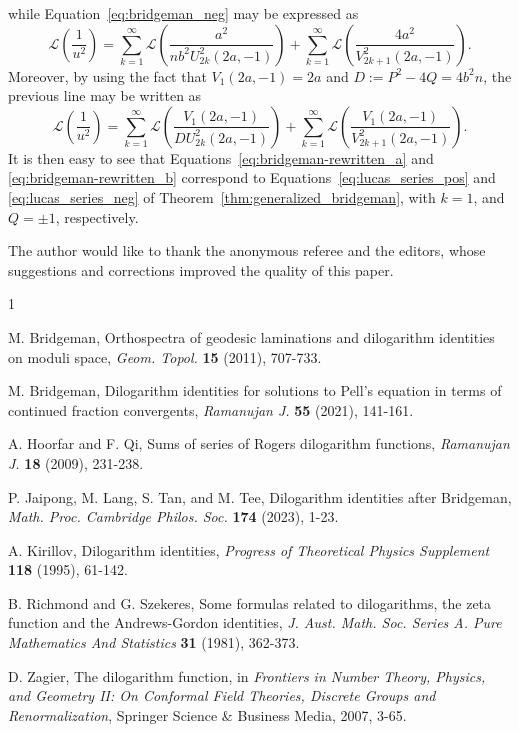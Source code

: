 \documentclass[10pt]{article}
\theoremstyle{definition}
\begin{document}
while Equation~\eqref{eq:bridgeman_neg} may be expressed as
\begin{equation*}
    \mathcal{L}\left(\frac{1}{u^2}\right) = \sum_{k=1}^{\infty}\mathcal{L}\left(\frac{a^2}{n b^2 U^2_{2k}(2a,-1)}\right) + \sum_{k=1}^{\infty}\mathcal{L}\left(\frac{4a^2}{V^2_{2k+1}(2a,-1)}\right). 
\end{equation*}
Moreover, by using the fact that $V_1(2a,-1) = 2a$ and $D := P^2-4Q = 4b^2n$, the previous line may be written as
\begin{equation}
    \mathcal{L}\left(\frac{1}{u^2}\right) = \sum_{k=1}^{\infty}\mathcal{L}\left(\frac{V_1(2a,-1)}{D U^2_{2k}(2a,-1)}\right) + \sum_{k=1}^{\infty}\mathcal{L}\left(\frac{V_1(2a,-1)}{V^2_{2k+1}(2a,-1)}\right). \label{eq:bridgeman-rewritten_b}
\end{equation}
It is then easy to see that Equations~\eqref{eq:bridgeman-rewritten_a} and \eqref{eq:bridgeman-rewritten_b} correspond to Equations~\eqref{eq:lucas_series_pos} and \eqref{eq:lucas_series_neg} of Theorem~\ref{thm:generalized_bridgeman}, with $k = 1$, and $Q=\pm1$, respectively.

\vskip 20pt
The author would like to thank the anonymous referee and the editors, whose suggestions and corrections improved the quality of this paper.

\begin{thebibliography}{1}\footnotesize

 M. Bridgeman, Orthospectra of geodesic laminations and dilogarithm identities on moduli space, {\em Geom. Topol.} \textbf{15} (2011), 707-733.

 M. Bridgeman, Dilogarithm identities for solutions to Pell’s equation in terms of continued fraction convergents, {\em Ramanujan J.} \textbf{55} (2021), 141-161.

 A. Hoorfar and F. Qi, Sums of series of Rogers dilogarithm functions, {\em Ramanujan J.} \textbf{18} (2009), 231-238.

 P. Jaipong,  M. Lang, S. Tan, and M. Tee, Dilogarithm identities after Bridgeman, {\em Math. Proc. Cambridge Philos. Soc.} \textbf{174} (2023), 1-23.

  A. Kirillov, Dilogarithm identities, {\em Progress of Theoretical Physics Supplement} \textbf{118} (1995), 61-142.

 B. Richmond and G. Szekeres, Some formulas related to dilogarithms, the zeta function and the Andrews-Gordon identities, {\em J. Aust. Math. Soc. Series A. Pure Mathematics And Statistics} \textbf{31} (1981), 362-373. 

 D. Zagier, The dilogarithm function, in {\em Frontiers in Number Theory, Physics, and Geometry II: On Conformal Field Theories, Discrete Groups and Renormalization}, Springer Science \& Business Media, 2007, 3-65. 

\end{thebibliography}
\end{document}
